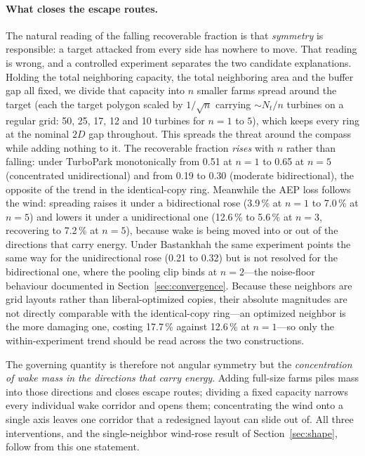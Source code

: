 \documentclass[wes, manuscript]{copernicus}
\begin{document}
\paragraph{What closes the escape routes.}
The natural reading of the falling recoverable fraction is that \emph{symmetry} is responsible: a target attacked from every side has nowhere to move.
That reading is wrong, and a controlled experiment separates the two candidate explanations.
Holding the total neighboring capacity, the total neighboring area and the buffer gap all fixed, we divide that capacity into $n$ smaller farms spread around the target (each the target polygon scaled by $1/\sqrt{n}$ carrying $\sim N_t/n$ turbines on a regular grid: 50, 25, 17, 12 and 10 turbines for $n = 1$ to $5$), which keeps every ring at the nominal $2D$ gap throughout.
This spreads the threat around the compass while adding nothing to it.
The recoverable fraction \emph{rises} with $n$ rather than falling: under TurboPark monotonically from 0.51 at $n = 1$ to 0.65 at $n = 5$ (concentrated unidirectional) and from 0.19 to 0.30 (moderate bidirectional), the opposite of the trend in the identical-copy ring.
Meanwhile the AEP loss follows the wind: spreading raises it under a bidirectional rose (3.9\,\% at $n = 1$ to 7.0\,\% at $n = 5$) and lowers it under a unidirectional one (12.6\,\% to 5.6\,\% at $n = 3$, recovering to 7.2\,\% at $n = 5$), because wake is being moved into or out of the directions that carry energy.
Under Bastankhah the same experiment points the same way for the unidirectional rose (0.21 to 0.32) but is not resolved for the bidirectional one, where the pooling clip binds at $n = 2$---the noise-floor behaviour documented in Section~\ref{sec:convergence}.
Because these neighbors are grid layouts rather than liberal-optimized copies, their absolute magnitudes are not directly comparable with the identical-copy ring---an optimized neighbor is the more damaging one, costing 17.7\,\% against 12.6\,\% at $n = 1$---so only the within-experiment trend should be read across the two constructions.

The governing quantity is therefore not angular symmetry but the \emph{concentration of wake mass in the directions that carry energy}.
Adding full-size farms piles mass into those directions and closes escape routes; dividing a fixed capacity narrows every individual wake corridor and opens them; concentrating the wind onto a single axis leaves one corridor that a redesigned layout can slide out of.
All three interventions, and the single-neighbor wind-rose result of Section~\ref{sec:shape}, follow from this one statement.
\end{document}
